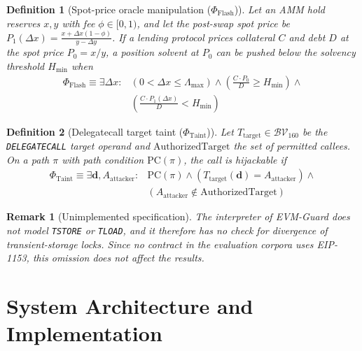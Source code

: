 \documentclass[pdflatex,sn-mathphys]{sn-jnl}
\theoremstyle{thmstyletwo}
\newtheorem{definition}{Definition}
\theoremstyle{thmstyletwo}
\newtheorem{remark}{Remark}
\begin{document}
\begin{definition}[Spot-price oracle manipulation ($\Phi_{\mathrm{Flash}}$)]\label{prop:flash}
Let an AMM hold reserves $x, y$ with fee $\phi \in [0,1)$, and let the post-swap spot price be $P_1(\Delta x) = \frac{x + \Delta x (1-\phi)}{y - \Delta y}$. If a lending protocol prices collateral $C$ and debt $D$ at the spot price $P_0 = x/y$, a position solvent at $P_0$ can be pushed below the solvency threshold $H_{\mathrm{min}}$ when
\begin{equation}
\begin{aligned}
    \Phi_{\mathrm{Flash}} \equiv \exists \Delta x : {} & (0 < \Delta x \le \Lambda_{\mathrm{max}}) \land \left( \tfrac{C \cdot P_0}{D} \ge H_{\mathrm{min}} \right) \land {} \\
    & \left( \tfrac{C \cdot P_1(\Delta x)}{D} < H_{\mathrm{min}} \right)
\end{aligned}
\end{equation}
\end{definition}

\begin{definition}[Delegatecall target taint ($\Phi_{\mathrm{Taint}}$)]\label{prop:taint}
Let $T_{\mathrm{target}} \in \mathcal{BV}_{160}$ be the \texttt{DELEGATECALL} target operand and $\mathrm{AuthorizedTarget}$ the set of permitted callees. On a path $\pi$ with path condition $\mathrm{PC}(\pi)$, the call is hijackable if
\begin{equation}
\begin{aligned}
    \Phi_{\mathrm{Taint}} \equiv \exists \mathbf{d}, A_{\mathrm{attacker}} : {} & \mathrm{PC}(\pi) \land (T_{\mathrm{target}}(\mathbf{d}) = A_{\mathrm{attacker}}) \land {} \\
    & (A_{\mathrm{attacker}} \notin \mathrm{AuthorizedTarget})
\end{aligned}
\end{equation}
\end{definition}

\begin{remark}[Unimplemented specification]
The interpreter of EVM-Guard does not model \texttt{TSTORE} or \texttt{TLOAD}, and it therefore has no check for divergence of transient-storage locks. Since no contract in the evaluation corpora uses EIP-1153, this omission does not affect the results.
\end{remark}

\section{System Architecture and Implementation}\label{sec:arch}
\end{document}
